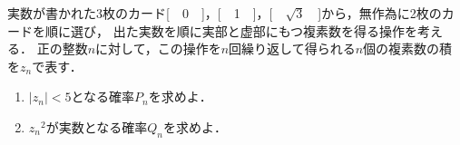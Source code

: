 \documentclass[../../main.tex]{subfiles}
\begin{document}
実数が書かれた3枚のカード[　0　]，[　1　]，[　$\sqrt3$　]から，無作為に2枚のカードを順に選び，
出た実数を順に実部と虚部にもつ複素数を得る操作を考える．
正の整数$n$に対して，この操作を$n$回繰り返して得られる$n$個の複素数の積を$z_n$で表す．
\begin{enumerate}
  \item$|z_n|<5$となる確率$P_n$を求めよ．
  \item${z_n}^2$が実数となる確率$Q_n$を求めよ．
\end{enumerate}
\end{document}
